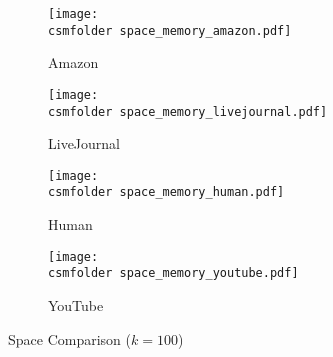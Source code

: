 \begin{figure}[h!]
\def\wscorevone{0.35}
\centering
    \begin{subfigure}[t]{\wscorevone\linewidth}
	    \centering
	    \resizebox{\linewidth}{!}
	    {
	        \texttt{[image: \\csmfolder space\_memory\_amazon.pdf]}
	    }
	    \caption{Amazon}
	    \label{fig:exp:space:memory:amazon}
    \end{subfigure}
    \begin{subfigure}[t]{\wscorevone\linewidth}
        \centering
        \resizebox{\linewidth}{!}
        {
            \texttt{[image: \\csmfolder space\_memory\_livejournal.pdf]}
        }
        \caption{LiveJournal}
        \label{fig:exp:space:memory:livejournal}
    \end{subfigure}
     \begin{subfigure}[t]{\wscorevone\linewidth}
         \centering
         \resizebox{\linewidth}{!}
         {
             \texttt{[image: \\csmfolder space\_memory\_human.pdf]}
         }
         \caption{Human}
         \label{fig:exp:space:memory:human}
     \end{subfigure}
     \begin{subfigure}[t]{\wscorevone\linewidth}
         \centering
         \resizebox{\linewidth}{!}
         {
             \texttt{[image: \\csmfolder space\_memory\_youtube.pdf]}
         }
         \caption{YouTube}
         \label{fig:exp:space:memory:youtube}
     \end{subfigure}
\caption{Space Comparison ($k=100$)}
\label{fig:exp:space:memory}
\end{figure}